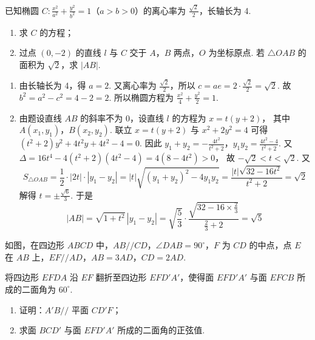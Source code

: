 \begin{problem}
已知椭圆 \(C:\frac{x^2}{a^2}+\frac{y^2}{b^2}=1\)（\(a>b>0\)）的离心率为 \(\frac{\sqrt2}{2}\)，长轴长为 4.
\begin{enumerate}
\item 求 \(C\) 的方程；
\item 过点 \((0,-2)\) 的直线 \(l\) 与 \(C\) 交于 \(A\)，\(B\) 两点，\(O\) 为坐标原点. 若 \(\triangle OAB\) 的面积为 \(\sqrt2\)，求 \(|AB|\).
\end{enumerate}
\end{problem}

\begin{solution}
\begin{enumerate}
\item 由长轴长为 4，得 \(a=2\). 又离心率为 \(\frac{\sqrt2}{2}\)，所以
\(c=ae=2\cdot \frac{\sqrt2}{2}=\sqrt2\).
故
\(b^2=a^2-c^2=4-2=2\).
所以椭圆方程为
\(\frac{x^2}{4}+\frac{y^2}{2}=1\).

\item 由题设直线 \(AB\) 的斜率不为 0，设直线 \(l\) 的方程为
\(x=t(y+2)\)，
其中 \(A(x_1,y_1)\)，\(B(x_2,y_2)\). 联立 \(x=t(y+2)\) 与 \(x^2+2y^2=4\)
可得
\((t^2+2)y^2+4t^2y+4t^2-4=0\).
因此
\(y_1+y_2=-\frac{4t^2}{t^2+2}\)，\(y_1y_2=\frac{4t^2-4}{t^2+2}\).
又
\(
\Delta=16t^4-4(t^2+2)(4t^2-4)=4(8-4t^2)>0
\)，
故
\(-\sqrt2<t<\sqrt2\).
又
\[
S_{\triangle OAB}=\frac12\cdot |2t|\cdot |y_1-y_2|
=|t|\sqrt{(y_1+y_2)^2-4y_1y_2}
=\frac{|t|\sqrt{32-16t^2}}{t^2+2}
=\sqrt2
\]
解得
\(t=\pm \frac{\sqrt6}{3}\).
于是
\[
|AB|=\sqrt{1+t^2}\,|y_1-y_2|
=\sqrt{\frac53}\cdot\frac{\sqrt{32-16\times\frac23}}{\frac23+2}
=\sqrt5
\]
\end{enumerate}
\end{solution}

\begin{problem}
如图，在四边形 \(ABCD\) 中，\(AB//CD\)，\(\angle DAB=90^\circ\)，\(F\) 为 \(CD\) 的中点，点 \(E\) 在 \(AB\) 上，\(EF//AD\)，\(AB=3AD\)，\(CD=2AD\).

将四边形 \(EFDA\) 沿 \(EF\) 翻折至四边形 \(EFD'A'\)，使得面 \(EFD'A'\) 与面 \(EFCB\) 所成的二面角为 \(60^\circ\).
\begin{enumerate}
\item 证明：\(A'B//\) 平面 \(CD'F\)；
\item 求面 \(BCD'\) 与面 \(EFD'A'\) 所成的二面角的正弦值.
\end{enumerate}

\end{problem}

